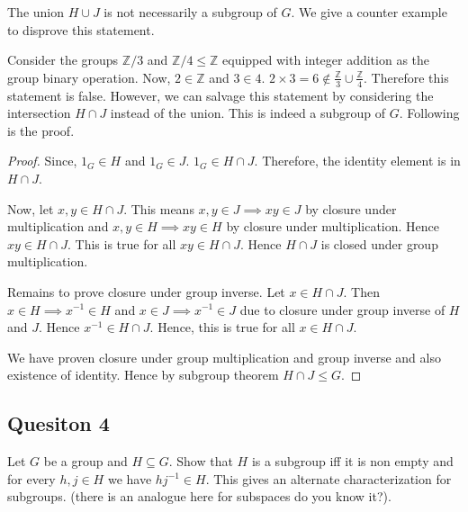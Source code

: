 \begin{solution}
  The union \( H \cup J \) is not necessarily a subgroup of \( G \).
  We give a counter example to disprove this statement.

  Consider the groups \( \mathbb{Z}/3 \) and \( \mathbb{Z}/4 \le \mathbb{Z}\) equipped with integer addition as the group binary operation. Now, \( 2 \in \mathbb{Z} \) and \( 3 \in 4 \). \( 2 \times 3 = 6 \notin \frac{\mathbb{Z}}{3} \cup \frac{\mathbb{Z}}{4}\).
  Therefore this statement is false. However, we can salvage this statement
  by considering the intersection \( H \cap J \) instead of the union. This is indeed a subgroup of \( G \).
  Following is the proof.

  \begin{proof}
   Since, \( 1_{G} \in H\) and \( 1_{G} \in J \). \( 1_{G} \in H \cap  J \). Therefore, the identity element is in \( H \cap J \).

  Now, let \( x, y \in H \cap J  \). This means \( x,y \in J \implies xy \in J \) by closure under multiplication
  and \( x,y \in H \implies xy \in H \) by closure under multiplication. Hence \( xy \in H \cap J \).
  This is true for all \(xy \in  H \cap J \). Hence \( H \cap J \) is closed under group multiplication.

  Remains to prove closure under group inverse. Let \( x \in H \cap J \). Then \( x \in H \implies x^{-1} \in H \) and \( x \in J \implies x^{-1} \in  J\) due to closure under group inverse
  of \( H \) and \( J \). Hence \( x^{-1} \in H \cap J \). Hence, this is true for all \( x \in H \cap J \).

  We have proven closure under group multiplication and group inverse and also existence of identity. Hence 
  by subgroup theorem \( H \cap J \le G\).
  \end{proof}
\end{solution}

\subsection{Quesiton 4}
Let \( G \) be a group and \( H \subseteq G\). Show that \( H \) is a subgroup iff it is
non empty and for every \( h,j \in H \) we have \( hj^{-1} \in H \). This gives an
alternate characterization for subgroups. (there is an analogue here for subspaces do you know it?).

